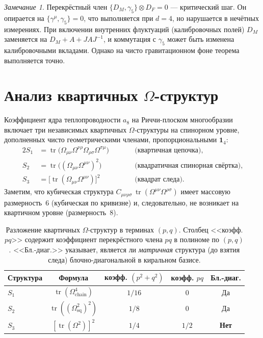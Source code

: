 \documentclass[12pt,a4paper]{article}
\theoremstyle{definition}
\theoremstyle{remark}
\newtheorem{remark}[theorem]{Замечание}
\newcommand{\tr}{\operatorname{tr}}
\begin{document}
\begin{remark}
Перекрёстный член $\{D_M, \gamma_5\} \otimes D_F = 0$ --- критический
шаг.  Он опирается на $\{\gamma^\mu, \gamma_5\} = 0$, что выполняется
при $d = 4$, но нарушается в нечётных измерениях.  При включении внутренних
флуктуаций (калибровочных полей) $D_M$ заменяется на
$D_M + A + JAJ^{-1}$, и коммутация с $\gamma_5$ может быть изменена
калибровочными вкладами.  Однако на чисто гравитационном фоне теорема
выполняется точно.
\end{remark}


\section{Анализ квартичных \texorpdfstring{$\Omega$}{Omega}-структур}
\label{sec:quartic}

Коэффициент ядра теплопроводности $a_8$ на Риччи-плоском многообразии
включает три независимых квартичных $\Omega$-структуры на спинорном уровне,
дополненных чисто геометрическими членами, пропорциональными
$\mathbf{1}_4$:
\begin{alignat}{2}
  S_1 &= \tr\!\bigl(\Omega_{\mu\nu}\Omega^{\nu\rho}\Omega_{\rho\sigma}
  \Omega^{\sigma\mu}\bigr) &\qquad &\text{(квартичная цепочка)},
  \label{eq:S1} \\
  S_2 &= \tr\!\bigl((\Omega_{\mu\nu}\Omega^{\mu\nu})^2\bigr) &\qquad
  &\text{(квадратичная спинорная свёртка)},
  \label{eq:S2} \\
  S_3 &= \bigl[\tr(\Omega_{\mu\nu}\Omega^{\mu\nu})\bigr]^2 &\qquad
  &\text{(квадрат следа)}.
  \label{eq:S3}
\end{alignat}
Заметим, что кубическая структура
$C_{\mu\nu\rho\sigma}\,\tr(\Omega^{\mu\nu}\Omega^{\rho\sigma})$
имеет массовую размерность~6 (кубическая по кривизне) и, следовательно,
не возникает на квартичном уровне (размерность~8).

\begin{table}[ht]
\centering
\caption{Разложение квартичных $\Omega$-структур в терминах $(p, q)$.
Столбец <<коэфф. $pq$>> содержит коэффициент перекрёстного члена $pq$
в полиноме по $(p,q)$.  <<Бл.-диаг.>> указывает, является ли
\emph{матричная} структура (до взятия следа) блочно-диагональной в
киральном базисе.}
\label{tab:omega}
\begin{tabular}{lcccc}
\toprule
Структура & Формула & коэфф. $(p^2{+}q^2)$ & коэфф. $pq$ & Бл.-диаг. \\
\midrule
$S_1$ & $\tr(\Omega^4_{\mathrm{chain}})$ & $1/16$ & $0$ & Да \\
$S_2$ & $\tr((\Omega^2_{\mathrm{sq}})^2)$ & $1/8$ & $0$ & Да \\
$S_3$ & $[\tr(\Omega^2)]^2$ & $1/4$ & $1/2$ & \textbf{Нет} \\
\bottomrule
\end{tabular}
\end{table}
\end{document}
